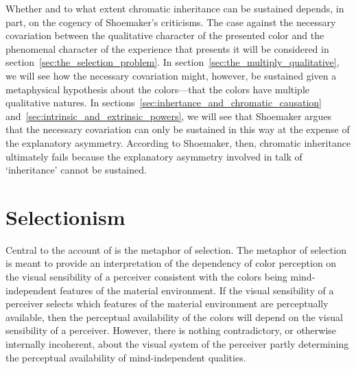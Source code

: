 \documentclass[12pt]{article}
\begin{document}
Whether and to what extent chromatic inheritance can be sustained depends, in part, on the cogency of Shoemaker's criticisms. The case against the necessary covariation between the qualitative character of the presented color and the phenomenal character of the experience that presents it will be considered in section~\ref{sec:the_selection_problem}. In section~\ref{sec:the_multiply_qualitative}, we will see how the necessary covariation might, however, be sustained given a metaphysical hypothesis about the colors---that the colors have multiple qualitative natures. In sections~\ref{sec:inhertance_and_chromatic_causation} and~\ref{sec:intrinsic_and_extrinsic_powers}, we will see that Shoemaker argues that the necessary covariation can only be sustained in this way at the expense of the explanatory asymmetry. According to Shoemaker, then, chromatic inheritance ultimately fails because the explanatory asymmetry involved in talk of `inheritance' cannot be sustained. 

\section{Selectionism}\label{sec:selectionism} 

Central to the account of \cite{Hilbert:2000on} is the metaphor of selection. The metaphor of selection is meant to provide an interpretation of the dependency of color perception on the visual sensibility of a perceiver consistent with the colors being mind-independent features of the material environment. If the visual sensibility of a perceiver selects which features of the material environment are perceptually available, then the perceptual availability of the colors will depend on the visual sensibility of a perceiver. However, there is nothing contradictory, or otherwise internally incoherent, about the visual system of the perceiver partly determining the perceptual availability of mind-independent qualities. \citep[See][39--53.]{Price:1932fk}
\end{document}
